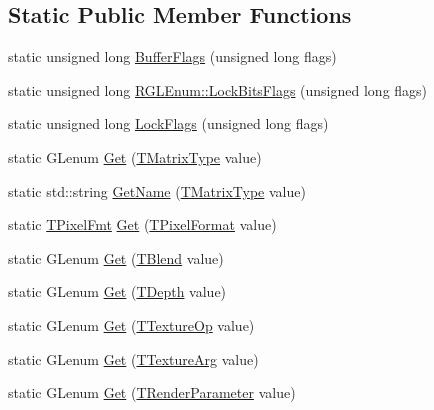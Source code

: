 \subsection*{Static Public Member Functions}
\begin{DoxyCompactItemize}
\item 
static unsigned long \hyperlink{class_agmd_1_1_r_g_l_enum_a360b3e2470edec20e1844f544d6d8a21}{Buffer\+Flags} (unsigned long flags)
\item 
static unsigned long \hyperlink{class_agmd_1_1_r_g_l_enum_aa0cd170bed764fa75867dd1cadd3fbe6}{R\+G\+L\+Enum\+::\+Lock\+Bits\+Flags} (unsigned long flags)
\item 
static unsigned long \hyperlink{class_agmd_1_1_r_g_l_enum_a1d1644e376f77e1a189f1146bd72c145}{Lock\+Flags} (unsigned long flags)
\item 
static G\+Lenum \hyperlink{class_agmd_1_1_r_g_l_enum_a068b1f934454cf573d301c7375b4e431}{Get} (\hyperlink{namespace_agmd_aa7eba958a8a0e3ac4586f75298e122b1}{T\+Matrix\+Type} value)
\item 
static std\+::string \hyperlink{class_agmd_1_1_r_g_l_enum_a714dc684ea3f8710736a0cc3e109c029}{Get\+Name} (\hyperlink{namespace_agmd_aa7eba958a8a0e3ac4586f75298e122b1}{T\+Matrix\+Type} value)
\item 
static \hyperlink{struct_agmd_1_1_r_g_l_enum_1_1_t_pixel_fmt}{T\+Pixel\+Fmt} \hyperlink{class_agmd_1_1_r_g_l_enum_ae50198378f9a83cd1181c827f00dbfa7}{Get} (\hyperlink{namespace_agmd_afc48fd9fa5dccb4c5621c052bfd1a7ec}{T\+Pixel\+Format} value)
\item 
static G\+Lenum \hyperlink{class_agmd_1_1_r_g_l_enum_a52457d1b507754e9c506476564373342}{Get} (\hyperlink{namespace_agmd_a5c64d61de9c502c3159b9ce5d653f947}{T\+Blend} value)
\item 
static G\+Lenum \hyperlink{class_agmd_1_1_r_g_l_enum_a9e7a02b3a6b171c7880f1e86e5af2988}{Get} (\hyperlink{namespace_agmd_a6bf1c529fabec2b3b33d9d94a032cc6a}{T\+Depth} value)
\item 
static G\+Lenum \hyperlink{class_agmd_1_1_r_g_l_enum_a17a2b642e4d8cd1ef3ec16f297ed3e5f}{Get} (\hyperlink{namespace_agmd_aafbdbe5caf9cc8574624faa1943bf5ef}{T\+Texture\+Op} value)
\item 
static G\+Lenum \hyperlink{class_agmd_1_1_r_g_l_enum_a5aee255b7d785a03c05ac995b8387141}{Get} (\hyperlink{namespace_agmd_ace3617cd312c454f60b4511e3e873db5}{T\+Texture\+Arg} value)
\item 
static G\+Lenum \hyperlink{class_agmd_1_1_r_g_l_enum_acbf45bab52968c0760c53b937092d2b7}{Get} (\hyperlink{namespace_agmd_afc630cffacc9bfc42e46816feb4744ae}{T\+Render\+Parameter} value)

\end{DoxyCompactItemize}
